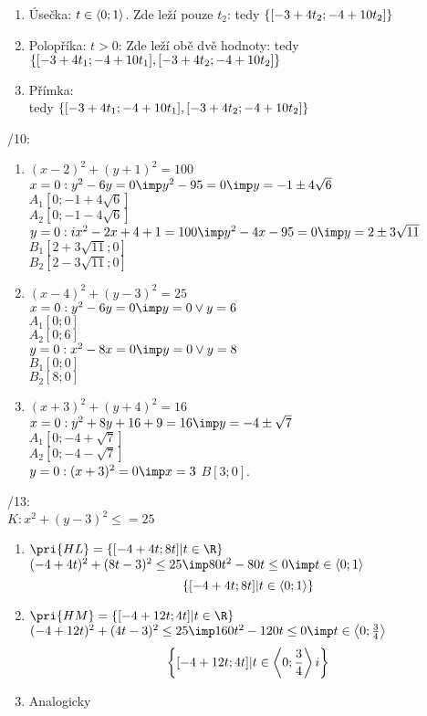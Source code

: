 \begin{enumerate}
	\item Úsečka: $t\in\left<0;1\right>$. Zde leží pouze $t_2$:
		tedy $\left\{{[-3+4t_2;-4+10t_2]}\right\}$
	\item Polopříka: $t>0$: Zde leží obě dvě hodnoty:
		tedy $\left\{{[-3+4t_1;-4+10t_1],[-3+4t_2;-4+10t_2]}\right\}$
	\item Přímka:\\
		tedy $\left\{{[-3+4t_1;-4+10t_1],[-3+4t_2;-4+10t_2]}\right\}$
\end{enumerate}
/10:\\
\begin{enumerate}
	\item $(x-2)^2 + (y+1)^2 = 100$\\
		$x=0: y^2-6y = 0 \imp y^2 -95=0 \imp y=-1\pm 4 \sqrt 6$\\
		$A_1[0;-1+4\sqrt 6]$\\
		$A_2[0;-1-4\sqrt 6]$\\
		$y=0:  ix^2-2x+4+1= 100 \imp y^2-4x-95=0 \imp y=2\pm 3 \sqrt{11}$\\
		$B_1[2+3\sqrt{11};0]$\\
		$B_2[2-3\sqrt{11};0]$
	\item $(x-4)^2+(y-3)^2 = 25$\\
		$x=0: y^2-6y = 0 \imp y=0 \lor y=6$\\
		$A_1[0;0]$\\
		$A_2[0;6]$\\
		$y=0: x^2 - 8x = 0 \imp y=0 \lor y=8$\\
		$B_1[0;0]$\\
		$B_2[8;0]$
	\item $(x+3)^2+(y+4)^2 = 16$\\
		$x=0:y^2+8y+16+9=16\imp y = -4 \pm \sqrt 7$\\
		$A_1 [0;-4+\sqrt 7]$\\
		$A_2 [0;-4-\sqrt 7]$\\
		$y=0: (x+3)^2=0 \imp x=3$
		$B [3;0]$.
\end{enumerate}

/13:\\
$K: x^2 + (y-3)^2 \le= 25$\\

\begin{enumerate}
\item
$\pri{HL} = \zs{[-4+4t;8t]|t\in\R}$
$(-4+4t)^2 + (8t-3)^2 \le 25 \imp 80t^2 - 80 t \le 0 \imp t\in\<0;1\>$
$$\left\{{[-4+4t;8t]|t\in\left<0;1\right>}\right\}$$
\item
$\pri{HM} = \zs{[-4+12t;4t]|t\in\R}$
$(-4+12t)^2 + (4t-3)^2 \le 25 \imp 160 t^2 - 120 t \le 0 \imp t\in\<0;\f 34\>$
$$\left\{{[-4+12t;4t]|t\in\left<0;\frac 3 4\right>i}\right\}$$
\item Analogicky
\end{enumerate}

